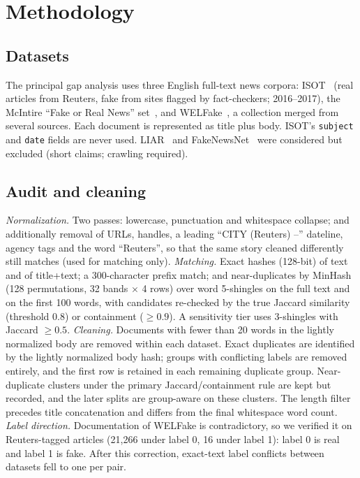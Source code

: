 \section{Methodology}
\subsection{Datasets}\label{sec:data}
The principal gap analysis uses three English full-text news corpora: ISOT~\cite{ahmed2017isot} (real articles from Reuters, fake from sites flagged by fact-checkers; 2016--2017), the McIntire ``Fake or Real News'' set~\cite{mcintire2017fakeorreal}, and WELFake~\cite{verma2021welfake}, a collection merged from several sources. Each document is represented as title plus body. ISOT's \texttt{subject} and \texttt{date} fields are never used. LIAR~\cite{wang2017liar} and FakeNewsNet~\cite{shu2020fakenewsnet} were considered but excluded (short claims; crawling required).

\subsection{Audit and cleaning}
\emph{Normalization.} Two passes: lowercase, punctuation and whitespace collapse; and additionally removal of URLs, handles, a leading ``CITY (Reuters) --'' dateline, agency tags and the word ``Reuters'', so that the same story cleaned differently still matches (used for matching only).
\emph{Matching.} Exact hashes (128-bit) of text and of title+text; a 300-character prefix match; and near-duplicates by MinHash (128 permutations, 32 bands $\times$ 4 rows) over word 5-shingles on the full text and on the first 100 words, with candidates re-checked by the true Jaccard similarity (threshold 0.8) or containment ($\geq 0.9$). A sensitivity tier uses 3-shingles with Jaccard $\geq 0.5$.
\emph{Cleaning.} Documents with fewer than 20 words in the lightly normalized body are removed within each dataset. Exact duplicates are identified by the lightly normalized body hash; groups with conflicting labels are removed entirely, and the first row is retained in each remaining duplicate group. Near-duplicate clusters under the primary Jaccard/containment rule are kept but recorded, and the later splits are group-aware on these clusters. The length filter precedes title concatenation and differs from the final whitespace word count.
\emph{Label direction.} Documentation of WELFake is contradictory, so we verified it on Reuters-tagged articles (21,266 under label 0, 16 under label 1): label 0 is real and label 1 is fake. After this correction, exact-text label conflicts between datasets fell to one per pair.

